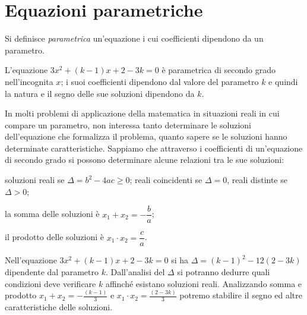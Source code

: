 \section{Equazioni parametriche}

\begin{definizione}

Si definisce \emph{parametrica} un'equazione i cui coefficienti dipendono da un parametro.
\end{definizione}

L'equazione $3 x^{2} + ( k - 1 ) x + 2 - 3 k= 0$ è parametrica di secondo grado nell'incognita $x$; i suoi coefficienti dipendono dal valore del parametro $k$ e quindi la natura e il segno delle sue soluzioni dipendono da $k$.

In molti problemi di applicazione della matematica in situazioni reali in cui compare un parametro, non interessa tanto determinare le soluzioni dell'equazione che formalizza il problema, quanto sapere se le soluzioni hanno determinate caratteristiche.
Sappiamo che attraverso i coefficienti di un'equazione di secondo grado si possono determinare alcune relazioni tra le sue soluzioni:
\begin{itemize*}
\item soluzioni reali se $\Delta = b^{2} - 4 a c \geq 0$; reali coincidenti se $\Delta = 0$, reali distinte se $\Delta > 0$;
\item la somma delle soluzioni è $x_{1} + x_{2} = - \dfrac{b}{a}$;
\item il prodotto delle soluzioni è $x_{1} \cdot x_{2} = \dfrac{c}{a}$.
\end{itemize*}

Nell'equazione $3 x^{2} + ( k - 1 ) x + 2 - 3 k = 0$ si ha $\Delta = ( k - 1 )^{2} - 12 ( 2 - 3 k )$ dipendente dal parametro $k$.
Dall'analisi del $\Delta$ si potranno dedurre quali condizioni deve verificare $k$ affinché esistano soluzioni reali. Analizzando somma e prodotto
$x_{1} + x_{2} = - \frac{( k - 1 )}{3}$ e $x_{1} \cdot x_{2} =\frac{( 2 - 3 k )}{3}$ potremo stabilire il segno ed altre caratteristiche delle soluzioni.

